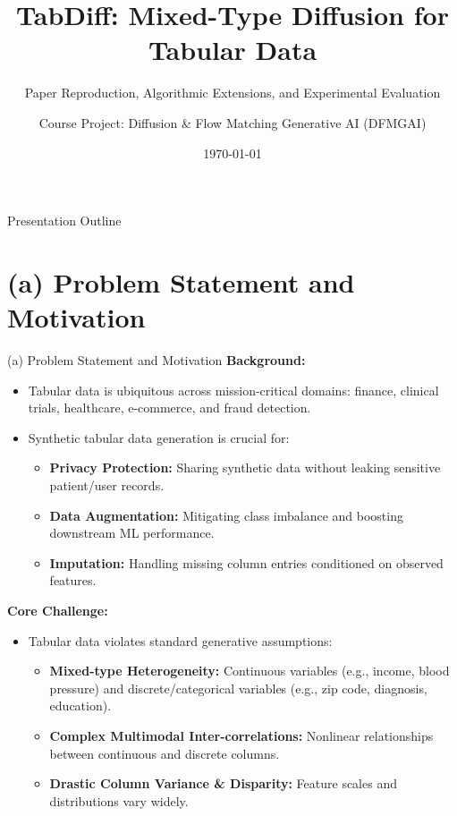 \documentclass[aspectratio=169, 10pt]{beamer}
\title[TabDiff Reproduction \& Extension]{TabDiff: Mixed-Type Diffusion for Tabular Data}
\subtitle{Paper Reproduction, Algorithmic Extensions, and Experimental Evaluation}
\author[DFMGAI Team]{Course Project: Diffusion \& Flow Matching Generative AI (DFMGAI)}
\institute[University]{Department of Computer Science \& Engineering}
\date{\today}
\begin{document}
\begin{frame}
  \titlepage
\end{frame}

\begin{frame}{Presentation Outline}
  \tableofcontents
\end{frame}

\section{(a) Problem Statement and Motivation}

\begin{frame}{(a) Problem Statement and Motivation}
  \textbf{Background:}
  \begin{itemize}
    \item Tabular data is ubiquitous across mission-critical domains: finance, clinical trials, healthcare, e-commerce, and fraud detection.
    \item Synthetic tabular data generation is crucial for:
      \begin{itemize}
        \item \textbf{Privacy Protection:} Sharing synthetic data without leaking sensitive patient/user records.
        \item \textbf{Data Augmentation:} Mitigating class imbalance and boosting downstream ML performance.
        \item \textbf{Imputation:} Handling missing column entries conditioned on observed features.
      \end{itemize}
  \end{itemize}
  \vspace{0.3cm}
  \textbf{Core Challenge:}
  \begin{itemize}
    \item Tabular data violates standard generative assumptions:
      \begin{itemize}
        \item \textbf{Mixed-type Heterogeneity:} Continuous variables (e.g., income, blood pressure) and discrete/categorical variables (e.g., zip code, diagnosis, education).
        \item \textbf{Complex Multimodal Inter-correlations:} Nonlinear relationships between continuous and discrete columns.
        \item \textbf{Drastic Column Variance \& Disparity:} Feature scales and distributions vary widely.
      \end{itemize}
  \end{itemize}
\end{frame}
\end{document}
